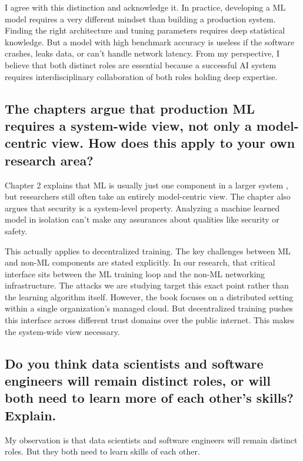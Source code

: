 \documentclass[11pt,a4paper]{article}
\begin{document}
I agree with this distinction and acknowledge it. In practice, developing a ML model requires a very different mindset than building a production system. Finding the right architecture and tuning parameters requires deep statistical knowledge. But a model with high benchmark accuracy is useless if the software crashes, leaks data, or can't handle network latency. From my perspective, I believe that both distinct roles are essential because a successful AI system requires interdisciplinary collaboration of both roles holding deep expertise.

\subsection{The chapters argue that production ML requires a system-wide view, not only a model-centric view. How does this apply to your own research area?}

Chapter 2 explains that ML is usually just one component in a larger system \cite{mlipbook02}, but researchers still often take an entirely model-centric view. The chapter also argues that security is a system-level property. Analyzing a machine learned model in isolation can't make any assurances about qualities like security or safety.

This actually applies to decentralized training. The key challenges between ML and non-ML components are stated explicitly. In our research, that critical interface sits between the ML training loop and the non-ML networking infrastructure. The attacks we are studying target this exact point rather than the learning algorithm itself. However, the book focuses on a distributed setting within a single organization's managed cloud. But decentralized training pushes this interface across different trust domains over the public internet. This makes the system-wide view necessary.

\subsection{Do you think data scientists and software engineers will remain distinct roles, or will both need to learn more of each other's skills? Explain.}

My observation is that data scientists and software engineers will remain distinct roles. But they both need to learn skills of each other.
\end{document}

